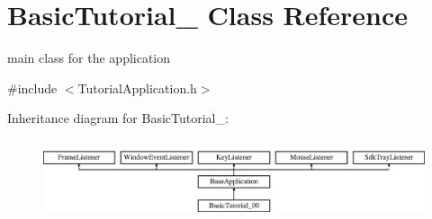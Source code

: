 \hypertarget{class_basic_tutorial__00}{}\section{Basic\+Tutorial\+\_ Class Reference}
\label{class_basic_tutorial__00}


main class for the application  




{\ttfamily \#include $<$Tutorial\+Application.\+h$>$}

Inheritance diagram for Basic\+Tutorial\+\_\+:\begin{figure}[H]
\begin{center}
\leavevmode
\includegraphics[height=2.382979cm]{class_basic_tutorial__00}
\end{center}
\end{figure}
